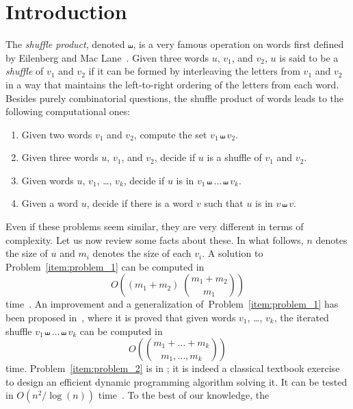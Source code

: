 \documentclass[a4paper]{llncs}
\begin{document}
\section{Introduction}
\label{section:Introduction}
The {\em shuffle product}, denoted $\shuffle$, is a very famous operation on words
first defined by Eilenberg and Mac Lane~\cite{Eilenberg:MacLane:1953}.
Given three words $u$, $v_1$, and $v_2$, $u$ is said to be a \emph{shuffle}
of $v_1$ and $v_2$ if it can be formed by interleaving the letters from
$v_1$ and $v_2$ in a way that maintains the left-to-right ordering of the
letters from each word.
Besides purely combinatorial questions,
the shuffle product of words leads to the following computational ones:
\begin{enumerate}
    \item \label{item:problem_1}
    Given two words $v_1$ and $v_2$, compute the set $v_1 \shuffle v_2$.
    \item \label{item:problem_2}
    Given three words $u$, $v_1$, and $v_2$, decide if $u$ is a shuffle
    of $v_1$ and $v_2$.
    \item \label{item:problem_3}
    Given words $u$, $v_1$, \dots, $v_k$, decide if $u$ is in
    $v_1 \shuffle \dots \shuffle v_k$.
    \item \label{item:problem_4}
    Given a word $u$, decide if there is a word $v$ such that $u$ is
    in $v \shuffle v$.
\end{enumerate}
Even if these problems seem similar, they are very different in terms
of complexity. Let us now review some facts about these. In what follows,
$n$ denotes the size of $u$ and $m_i$ denotes the size of each $v_i$.
A solution to Problem~\ref{item:problem_1} can be computed in
\begin{equation}
    O\left((m_1 + m_2) \; \binom{m_1 + m_2}{m_1}\right)
\end{equation}
time~\cite{Spehner:TCS:1986}. An improvement and a generalization
of~Problem~\ref{item:problem_1} has been proposed
in~\cite{Allauzen:IGM:2000}, where it is proved that given words
$v_1$, \dots, $v_k$, the iterated shuffle
$v_1 \shuffle \dots \shuffle v_k$ can be computed in
\begin{equation}
    O\left(\binom{m_1 + \dots + m_k}{m_1, \dots, m_k}\right)
\end{equation}
time. Problem~\ref{item:problem_2} is in \Pclass; it is indeed a
classical textbook exercise to design an efficient dynamic programming
algorithm solving it. It can be tested in $O\left(n^2 / \log(n)\right)$
time~\cite{Leeuwen:Nivat:IPL:1982}. To the best of our knowledge, the
\end{document}
